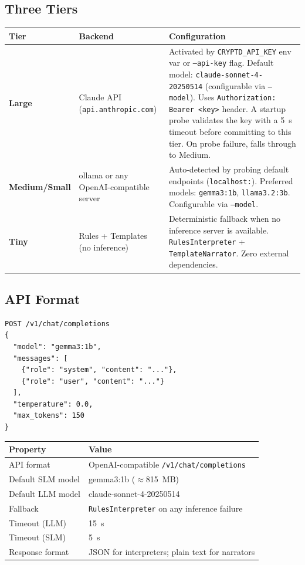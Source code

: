 \documentclass[a4paper,10pt]{article}
\newcommand{\cmd}[1]{\texttt{#1}}
\begin{document}
\subsection{Three Tiers}

\begin{center}
\small
\begin{tabular}{lp{3.2cm}p{6.5cm}}
\toprule
\textbf{Tier} & \textbf{Backend} & \textbf{Configuration} \\
\midrule
\textbf{Large}
  & Claude API (\texttt{api.\allowbreak anthropic.\allowbreak com})
  & Activated by \texttt{CRYPTD\_API\_KEY} env var or
    \cmd{--api-key} flag.  Default model:
    \texttt{claude-sonnet-4-20250514} (configurable via
    \cmd{--model}).  Uses \texttt{Authorization: Bearer <key>}
    header.  A startup probe validates the key with a 5~s timeout
    before committing to this tier.  On probe failure, falls
    through to Medium. \\
\textbf{Medium/\allowbreak Small}
  & ollama or any OpenAI-compatible server
  & Auto-detected by probing default endpoints
    (\texttt{localhost:\allowbreak 11434}).  Preferred models:
    \texttt{gemma3:1b}, \texttt{llama3.2:3b}.  Configurable via
    \cmd{--model}. \\
\textbf{Tiny}
  & Rules + Templates (no inference)
  & Deterministic fallback when no inference server is available.
    \texttt{Rules\-Interpreter} + \texttt{Template\-Narrator}.
    Zero external dependencies. \\
\bottomrule
\end{tabular}
\end{center}

\subsection{API Format}

\begin{lstlisting}[title={Inference request (all tiers)}]
POST /v1/chat/completions
{
  "model": "gemma3:1b",
  "messages": [
    {"role": "system", "content": "..."},
    {"role": "user", "content": "..."}
  ],
  "temperature": 0.0,
  "max_tokens": 150
}
\end{lstlisting}

\begin{center}
\begin{tabular}{ll}
\toprule
\textbf{Property} & \textbf{Value} \\
\midrule
API format         & OpenAI-compatible \texttt{/v1/chat/completions} \\
Default SLM model  & gemma3:1b ($\approx$815~MB) \\
Default LLM model  & claude-sonnet-4-20250514 \\
Fallback           & \texttt{RulesInterpreter} on any inference failure \\
Timeout (LLM)      & 15~s \\
Timeout (SLM)      & 5~s \\
Response format    & JSON for interpreters; plain text for narrators \\
\bottomrule
\end{tabular}
\end{center}
\end{document}
